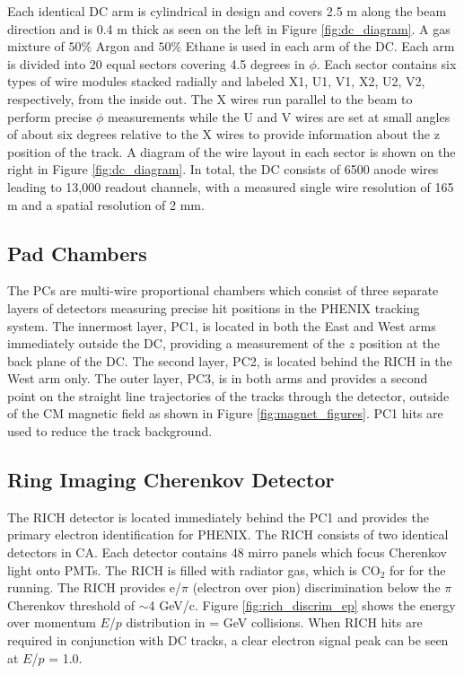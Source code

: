 Each identical DC arm is cylindrical in design and covers 2.5 m along the beam direction and is 0.4 m thick as seen on the left in Figure \ref{fig:dc_diagram}. A gas mixture of $50\%$ Argon and $50\%$ Ethane is used in each arm of the DC. Each arm is divided into 20 equal sectors covering 4.5 degrees in $\phi$. Each sector contains six types of wire modules stacked radially and labeled X1, U1, V1, X2, U2, V2, respectively, from the inside out. The X wires run parallel to the beam to perform precise $\phi$ measurements while the U and V wires are set at small angles of about six degrees relative to the X wires to provide information about the z position of the track. A diagram of the wire layout in each sector is shown on the right in Figure \ref{fig:dc_diagram}. In total, the DC consists of 6500 anode wires leading to 13,000 readout channels, with a measured single wire resolution of 165 m and a spatial resolution of  2 mm.

\subsection{Pad Chambers}
The PCs are multi-wire proportional chambers which consist of three separate layers of detectors measuring precise hit positions in the PHENIX tracking system. The innermost layer, PC1, is located in both the East and West arms immediately outside the DC, providing a measurement of the $z$ position at the back plane of the DC. The second layer, PC2, is located behind the RICH in the West arm only. The outer layer, PC3, is in both arms and provides a second point on the straight line trajectories of the tracks through the detector, outside of the CM magnetic field as shown in Figure \ref{fig:magnet_figures}. PC1 hits are used to reduce the track background.

\subsection{Ring Imaging Cherenkov Detector}
The RICH detector is located immediately behind the PC1 and provides the primary electron identification for PHENIX. The RICH consists of two identical detectors in CA. Each detector contains 48 mirro panels which focus Cherenkov light onto PMTs. The RICH is filled with radiator gas, which is CO$_2$ for for the \pau running. The RICH provides e/$\pi$ (electron over pion) discrimination below the $\pi$ Cherenkov threshold of $\sim$4 GeV/c. Figure \ref{fig:rich_discrim_ep} shows the energy over momentum $E$/$p$ distribution in \auau =  GeV collisions. When RICH hits are required in conjunction with DC tracks, a clear electron signal peak can be seen at $E$/$p$ = 1.0.

